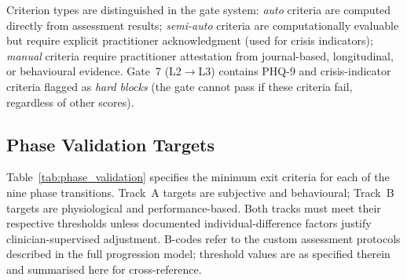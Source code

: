 \documentclass[12pt, a4paper]{article}
\begin{document}
Criterion types are distinguished in the gate system: \emph{auto} criteria are
computed directly from assessment results; \emph{semi-auto} criteria are computationally
evaluable but require explicit practitioner acknowledgment (used for crisis indicators);
\emph{manual} criteria require practitioner attestation from journal-based,
longitudinal, or behavioural evidence. Gate~7 (L2$\to$L3) contains PHQ-9 and
crisis-indicator criteria flagged as \emph{hard blocks} (the gate cannot pass if
these criteria fail, regardless of other scores).

\subsection{Phase Validation Targets}

Table~\ref{tab:phase_validation} specifies the minimum exit criteria for each
of the nine phase transitions. Track~A targets are subjective and behavioural;
Track~B targets are physiological and performance-based. Both tracks must meet
their respective thresholds unless documented individual-difference factors
justify clinician-supervised adjustment. B-codes refer to the custom assessment
protocols described in the full progression model; threshold values are as
specified therein and summarised here for cross-reference.
\end{document}

